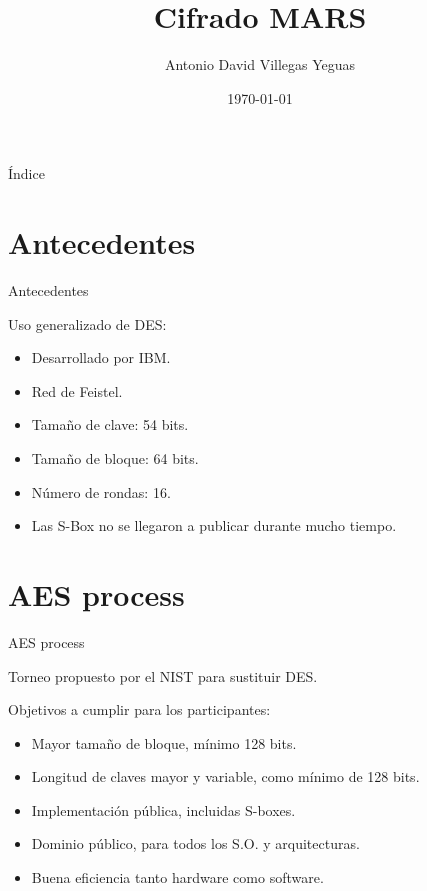 \documentclass{beamer}
\title{Cifrado MARS}
\date{\today}
\author{Antonio David Villegas Yeguas}
\institute{Universidad de Granada\\
\medskip
\textit{advy99@correo.ugr.es}
\doclicenseThis
}
\begin{document}
 \maketitle

\begin{frame}{Índice}
\tableofcontents
\end{frame}




\section{Antecedentes}
\begin{frame}{Antecedentes}

	Uso generalizado de DES:

	\begin{itemize}
		\item Desarrollado por IBM.
		\item Red de Feistel.
		\item Tamaño de clave: 54 bits.
		\item Tamaño de bloque: 64 bits.
		\item Número de rondas: 16.
		\item Las S-Box no se llegaron a publicar durante mucho tiempo.
	\end{itemize}

\end{frame}


\section{AES process}
\begin{frame}{AES process}

	Torneo propuesto por el NIST para sustituir DES.

	Objetivos a cumplir para los participantes:

	\begin{itemize}
		\item Mayor tamaño de bloque, mínimo 128 bits.
		\item Longitud de claves mayor y variable, como mínimo de 128 bits.
		\item Implementación pública, incluidas S-boxes.
		\item Dominio público, para todos los S.O. y arquitecturas.
		\item Buena eficiencia tanto hardware como software.
	\end{itemize}

\end{frame}
\end{document}
